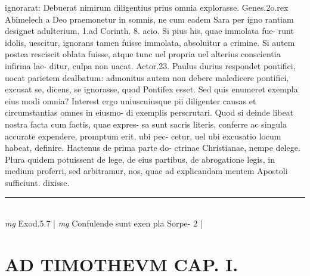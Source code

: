 \documentclass{article}
\begin{document}
\begin{pages}
ignorarat: Debuerat nimirum diligentius prius omnia explorasse. Genes.2o.rex Abimelech a Deo praemonetur in somnis, ne cum eadem Sara per igno rantiam designet adulterium. 1.ad Corinth. 8. acio. Si pius his, quae immolata fue-   runt idolis, uescitur, ignorans tamen fuisse immolata, absoluitur a crimine. Si autem   postea resciscit oblata fuisse, atque  tunc uel propria uel alterius conscientia infirma lae-   ditur, culpa non uacat. Actor.23. Paulus durius respondet pontifici, uocat parietem dealbatum: admonitus autem non debere maledicere pontifici, excusat se, dicens, se ignorasse, quod Pontifex esset. Sed quis enumeret exempla eius modi omnia? Interest ergo uniuscuiusque pii diligenter causas et circumstantias omnes in eiusmo- di exemplis perscrutari. Quod si deinde libeat nostra facta cum factis, quae expres- sa sunt sacris literis, conferre ac singula accurate expendere, promptum erit, ubi pec- cetur, uel ubi excusatio locum habeat, definire. Hactenus de prima parte do- ctrinae Christianae, nempe delege. Plura quidem potuissent de lege, de eius partibus, de abrogatione legis, in medium proferri, sed arbitramur, nos, quae ad explicandam mentem Apostoli sufficiunt. dixisse.  \pend
\vspace{0.5cm}\noindent
\vspace{0.2cm}\rule{1cm}{0.2pt}\\ 
\hspace{0.2cm}\textit{mg}
\footnotesize Exod.5.7 
\normalsize| 
\hspace{0.2cm}\textit{mg}
\footnotesize Confulende sunt exen pla Sorpe- 2 
\normalsize| 
\section*{AD TIMOTHEVM CAP. I. }
\marginpar{[ p.44 ]}
{}

\end{pages}
\end{document}
